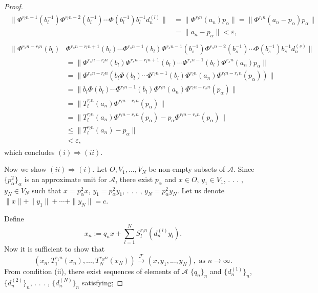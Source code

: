 \documentclass{article}
\begin{document}
\begin{proof}
\begin{eqnarray}\begin{split}\nonumber
\|\Phi^{r_{l}n-1}(b^{-1}_{l})\Phi^{r_{l}n-2}(b^{-1}_{l})\cdots\Phi(b^{-1}_{l})b^{-1}_{l}d^{(l)}_{n}\|&=\|\Phi^{r_{l}n}(a_{n})p_{\alpha}\|=\|\Phi^{r_{l}n}(a_{n}-p_{\alpha})p_{\alpha}\|
\\
&=\|a_{n}-p_{\alpha}\|<\varepsilon,
\end{split}
\end{eqnarray}
\begin{eqnarray}\begin{split}\nonumber
\|\Phi^{r_{s}n-r_{l}n}(b_{l})&\Phi^{r_{s}n-r_{l}n+1}(b_{l})\cdots\Phi^{r_{s}n-1}(b_{l})\Phi^{r_{s}n-1}(b^{-1}_{s})\Phi^{r_{s}n-2}(b^{-1}_{s})\cdots \Phi(b^{-1}_{s})b^{-1}_{s}d^{(s)}_{n}\|
\\
&=\|\Phi^{r_{s}n-r_{l}n}(b_{l})\Phi^{r_{s}n-r_{l}n+1}(b_{l})\cdots\Phi^{r_{s}n-1}(b_{l})\Phi^{r_{s}n}(a_{n})p_{\alpha}\|
\\
&=\|\Phi^{r_{s}n-r_{l}n}(b_{l}\Phi(b_{l})\cdots\Phi^{r_{l}n-1}(b_{l})\Phi^{r_{l}n}(a_{n})\Phi^{r_{l}n-r_{s}n}(p_{\alpha}))\|
\\
&=\|b_{l}\Phi(b_{l})\cdots \Phi^{r_{l}n-1}(b_{l}) \Phi^{r_{l}n}(a_{n})\Phi^{r_{l}n-r_{s}n}(p_{\alpha})\|
\\
&=\|T^{r_{l}n}_{l}(a_{n})\Phi^{r_{l}n-r_{s}n}(p_{\alpha})\|
\\
&=\|T^{r_{l}n}_{l}(a_{n})\Phi^{r_{l}n-r_{s}n}(p_{\alpha})-p_{\alpha}\Phi^{r_{l}n-r_{s}n}(p_{\alpha})\|
\\
&\leq\|T^{r_{l}n}_{l}(a_{n})-p_{\alpha}\|
\\
&<\varepsilon,
\end{split}
\end{eqnarray}
which concludes $(i)\Rightarrow(ii)$.

Now we show $(ii)\Rightarrow(i)$. Let $O, V_{1}, ..., V_{N}$ be non-empty subsets of $\mathcal{A}$. Since $\{p^{2}_{\alpha}\}_{\alpha}$ is an approximate unit for $\mathcal{A}$, there exist $p_{\alpha}$ and $x\in O$, $y_{1}\in V_{1}$, . . . , $y_{N}\in V_{N}$ such that $x=p^{2}_{\alpha}x$, $y_{1}=p^{2}_{\alpha}y_{1}$, . . . , $y_{N}=p^{2}_{\alpha}y_{N}$. 
Let us denote $\|x\|+\|y_{1}\|+\cdots+\|y_{N}\|=c$.

Define 
\[x_{n}:=q_{n}x+\sum^{N}_{l=1}S^{r_{l}n}_{l}(d^{(l)}_{n}y_{l}).\]
Now it is sufficient to show that 
\[(x_{n}, T^{r_{1}n}_{1}(x_{n}), ..., T^{r_{N}n}_{N}(x_{N}))\stackrel{\mathcal F}{\longrightarrow} (x, y_{1}, ..., y_{N}), \textrm{ as } n\rightarrow \infty.\] 
From condition (ii), there exist sequences of elements of $\mathcal{A}$ $\{q_{n}\}_{n}$ and $\{d^{(1)}_{n}\}_{n}$, $\{d^{(2)}_{n}\}_{n}$, . . . , $\{d^{(N)}_{n}\}_{n}$  satisfying;


\end{proof}
\end{document}
